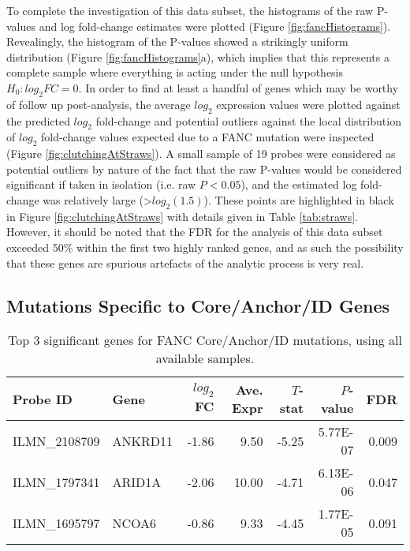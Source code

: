 \documentclass{article}\usepackage{knitr}
\begin{document}
To complete the investigation of this data subset, the histograms of the raw P-values and log fold-change estimates were plotted (Figure \ref{fig:fancHistograms}).
Revealingly, the histogram of the P-values showed a strikingly uniform distribution (Figure \ref{fig:fancHistograms}a), which implies that this represents a complete sample where everything is acting under the null hypothesis $H_0: log_2FC=0$.
In order to find at least a handful of genes which may be worthy of follow up post-analysis, the average $log_2$ expression values were plotted against the predicted $log_2$ fold-change and potential outliers against the local distribution of $log_2$ fold-change values expected due to a FANC mutation were inspected (Figure \ref{fig:clutchingAtStraws}).
A small sample of 19 probes were considered as potential outliers by nature of the fact that the raw P-values would be considered significant if taken in isolation (i.e. raw $P<0.05$), and the estimated log fold-change was relatively large (\textgreater $log_2(1.5)$).
These points are highlighted in black in Figure \ref{fig:clutchingAtStraws} with details given in Table \ref{tab:straws}.
However, it should be noted that the FDR for the analysis of this data subset exceeded 50\% within the first two highly ranked genes, and as such the possibility that these genes are spurious artefacts of the analytic process is very real.



\clearpage
\subsection{Mutations Specific to Core/Anchor/ID Genes}







\begin{table}[ht]
\centering
\caption{Top 3 significant genes for FANC Core/Anchor/ID mutations, using all available samples.} 
\label{tableFCA}
{\footnotesize
\begin{tabular}{llrrrrr}
  \toprule 
 Probe ID & Gene & $log_2$FC & Ave. Expr & $T$-stat & $P$-value & FDR\\
 \midrule 
 ILMN\_2108709 & ANKRD11 & -1.86 & 9.50 & -5.25 & 5.77E-07 & 0.009 \\ 
  ILMN\_1797341 & ARID1A & -2.06 & 10.00 & -4.71 & 6.13E-06 & 0.047 \\ 
  ILMN\_1695797 & NCOA6 & -0.86 & 9.33 & -4.45 & 1.77E-05 & 0.091 \\ 
   \bottomrule 
\end{tabular}
}
\end{table}
\end{document}
